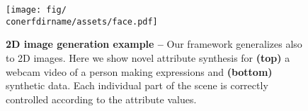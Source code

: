 \begin{figure}
  \centering
  \texttt{[image: fig/\\conerfdirname/assets/face.pdf]}
  \caption{
    {\bf 2D image generation example -- }
    Our framework generalizes also to 2D images.
    Here we show novel attribute synthesis for {\bf (top)} a webcam video of a
    person making expressions and {\bf (bottom)} synthetic data.
    Each individual part of the scene is correctly controlled according to the
    attribute values.
  }
  \label{fig:conerf-2d-interpolation}
\end{figure}